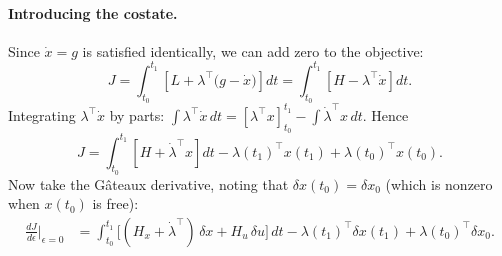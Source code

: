 \documentclass[12pt,a4paper]{article}
\theoremstyle{definition}
\theoremstyle{plain}
\theoremstyle{remark}
\begin{document}
\paragraph{Introducing the costate.}
Since $\dot{x} = g$ is satisfied identically, we can add zero to the objective:
\[
  J = \int_{t_0}^{t_1} \left[L + \lambda^\top\!\bigl(g - \dot{x}\bigr)\right] dt
  = \int_{t_0}^{t_1} \left[H - \lambda^\top \dot{x}\right] dt.
\]
Integrating $\lambda^\top \dot{x}$ by parts: $\int \lambda^\top \dot{x}\, dt = [\lambda^\top x]_{t_0}^{t_1} - \int \dot{\lambda}^\top x\, dt$. Hence
\[
  J = \int_{t_0}^{t_1} \left[H + \dot{\lambda}^\top x\right] dt - \lambda(t_1)^\top x(t_1) + \lambda(t_0)^\top x(t_0).
\]
Now take the Gâteaux derivative, noting that $\delta x(t_0) = \delta x_0$ (which is nonzero when $x(t_0)$ is free):
\begin{align}
  \frac{dJ}{d\epsilon}\bigg|_{\epsilon=0}
  &= \int_{t_0}^{t_1} \bigl[(H_x + \dot{\lambda}^\top)\,\delta x + H_u\,\delta u\bigr]\, dt - \lambda(t_1)^\top \delta x(t_1) + \lambda(t_0)^\top \delta x_0.
  \label{eq:gateaux_augmented}
\end{align}
\end{document}
